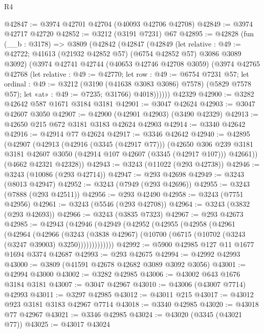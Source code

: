 \begin{lexlean}{R4}
\begin{coremodule}
@42847 := @3974 @42701 @42704 (@40093 @42706 @42708)
@42849 := @3974 @42717 @42720
@42852 := @3212 (@3191 @7231) @67
@42895 := @42828
    (fun (__b : @3178) =>
    @3809
      (@42842
        (@42847
          (@42849
            (let relative : @49 := @42722;
            @41613 (@21932 @42852 @57) (@6754 @42852 @57) @3086 @3089 @3092)
            (@3974
              @42741
              @42744
              (@40653 @42746 @42708 @3059)
              (@3974
                @42765
                @42768
                (let relative : @49 := @42770;
                let row : @49 := @6754 @7231 @57;
                let ordinal : @49 := @3212 (@3190 (@41638 @3083 @3086) @7578) (@5829 @7578 @57);
                let «at» : @49 := @7235; @31766)
                @4018))))))
    @42329
@42900 := @3282 @42642 @587 @1671 @3184 @3181
@42901 := @3047 @42624
@42903 := @3047 @42607 @3050
@42907 := @42900 (@42901 @42903) (@3490 @42329)
@42913 := @42650 @215 @672 @3181 @3183 @42624 @42903
@42914 := @3340 @42642
@42916 := @42914 @77 @42624
@42917 := @3346 @42642
@42940 := @42895
    (@42907
      (@42913
        (@42916 (@3345 (@42917 @77)))
        (@42650
          @306
          @239
          @3181
          @3181
          @42607
          @3050
          (@42914 @107 @42607 (@3345 (@42917 @107)))
          @42661))
      (@4662 @42321 @42328))
@42943 := @3243 (@11022 (@293 @42738))
@42946 := @3243 (@10086 (@293 @42714))
@42947 := @293 @42698
@42949 := @3243 (@8013 @42947)
@42952 := @3243 (@7949 (@293 @42696))
@42955 := @3243 (@7888 (@293 @42511))
@42956 := @293 @42490
@42958 := @3243 (@7751 @42956)
@42961 := @3243 (@5546 (@293 @42708))
@42964 := @3243 (@3832 (@293 @42693))
@42966 := @3243 (@3835 @7323)
@42967 := @293 @42673
@42985 := @42943
    (@42946
      (@42949
        (@42952
          (@42955
            (@42958
              (@42961
                (@42964
                  (@42966
                    (@3243
                      (@3838 @42967)
                      (@10700 (@6715 (@10702 (@3243 (@3247 @39003) @3250)))))))))))))
@42992 := @5900 @42985 @127 @11 @1677 @1694 @3374 @42687
@42993 := @293 @42675
@42994 := @42992 @42993
@43000 := @3809 (@41591 @42678 @42682 @3089 @3092 @3056)
@43001 := @42994 @43000
@43002 := @3282 @42985
@43006 := @43002 @643 @1676 @3184 @3181
@43007 := @3047 @42967
@43010 := @43006 (@43007 @7714) @42993
@43011 := @3297 @42985
@43012 := @43011 @215
@43017 := @43012 @923 @3181 @3183 @42967 @7714
@43018 := @3340 @42985
@43020 := @43018 @77 @42967
@43021 := @3346 @42985
@43024 := @43020 (@3345 (@43021 @77))
@43025 := @43017 @43024

\end{coremodule}
\end{lexlean}
